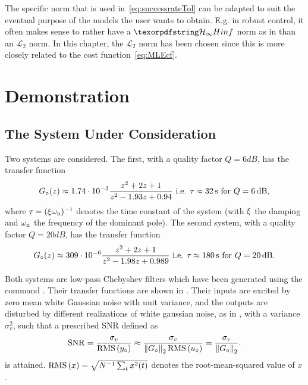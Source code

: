 \begin{remark}
The specific norm that is used in~\eqref{eq:successrateTol} can be adapted to suit the eventual purpose of the models the user wants to obtain.
E.g. in robust control, it often makes sense to rather have a $\Hinf$ norm as in  than an $\mathcal{L}_2$ norm.
In this chapter, the $\mathcal{L}_2$ norm has been chosen since this is more closely related to the cost function~\eqref{eq:MLEcf}.
\end{remark}

\section{Demonstration}\label{sec:initial-values:Demo}

\subsection{The System Under Consideration}

Two systems are considered. 
The first, with a quality factor $Q = 6\unit{dB}$, has the transfer function
  \begin{equation}
     {G}_{\circ}(z)
    \approx 
    1.74 \cdot 10^{-3}
    \frac{ z^2 + 2 z + 1 }
         { z^2 - 1.93 z + 0.94}
    \text{ i.e. }
    \tau_{} \approx 32 \,\mathrm{s}
    \text{ for } Q = 6 \,\mathrm{dB}
    \label{eq:systemundertest}
    \text{,}
  \end{equation}
where $\tau_{} = (\xi_{} \omega_{\mathrm{n}})^{-1}$ denotes the time constant of the system (with $\xi_{}$ the damping and $\omega_{\mathrm{n}}$ the frequency of the dominant pole).
The second system, with a quality factor $Q = 20\unit{dB}$, has the transfer function
  \begin{equation}
    {G}_{\circ}(z)
    \approx
    309 \cdot 10^{-6}
            \frac{z^2 + 2 z + 1}
                 {z^2 - 1.98 z + 0.989}
    \text{ i.e. }
    \tau_{} \approx 180 \,\mathrm{s}
    \text{ for } Q = 20 \,\mathrm{dB}
    \label{eq:systundertest-20dB}
    \text{.}
  \end{equation}

Both systems are low-pass Chebyshev filters which have been generated using the \MATLAB command .
Their transfer functions are shown in .
Their inputs are excited by zero mean white Gaussian noise with unit variance, and the outputs are disturbed by different realizations of white gaussian noise, as in , with a variance $\sigma_v^2$, such that a prescribed \gls{SNR} defined as
\begin{equation}
  \mathrm{SNR} 
    = \frac{\sigma_v}
           {\operatorname{RMS} \left( {y}_{\circ} \right)}
    \approx \frac{\sigma_{v}}
                 {\left\| {G}_{\circ} \right\|_2 \operatorname{RMS} \left( {u}_{\circ} \right)}
    =  \frac{\sigma_{v}}
            {\left\| {G}_{\circ} \right\|_2}
  \label{eq:SNR-definition}
  \text{.}
\end{equation}
is attained.
$\operatorname{RMS} \left( x \right) = \sqrt{N^{-1} \sum_t x^2(t)}$ denotes the root-mean-squared value of $x$.

